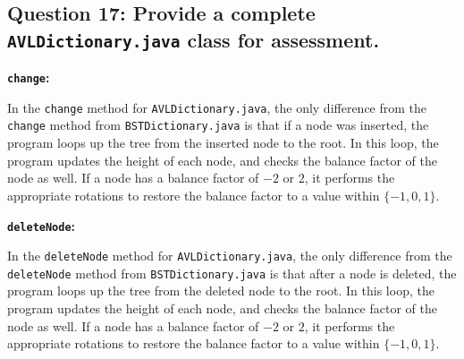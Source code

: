 \documentclass[a4paper, 12pt, titlepage]{article}
\def\code#1{\texttt{#1}}
\begin{document}
\subsection*{Question 17: Provide a complete \code{AVLDictionary.java} class for assessment.} 

\noindent
\textbf{\code{change}:}

In the \code{change} method for \code{AVLDictionary.java},
the only difference from the \code{change} method from \code{BSTDictionary.java} is that if a node was inserted,
the program loops up the tree from the inserted node to the root.
In this loop,
the program updates the height of each node,
and checks the balance factor of the node as well.
If a node has a balance factor of $-2$ or $2$,
it performs the appropriate rotations to restore the balance factor to a value within $\{-1, 0, 1\}$.

\noindent
\textbf{\code{deleteNode}:}

In the \code{deleteNode} method for \code{AVLDictionary.java},
the only difference from the \code{deleteNode} method from \code{BSTDictionary.java} is that after a node is deleted,
the program loops up the tree from the deleted node to the root.
In this loop,
the program updates the height of each node,
and checks the balance factor of the node as well.
If a node has a balance factor of $-2$ or $2$,
it performs the appropriate rotations to restore the balance factor to a value within $\{-1, 0, 1\}$.
\end{document}
